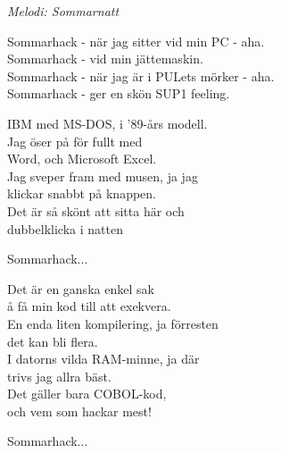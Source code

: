 {\footnotesize\textit{Melodi: Sommarnatt}}\par
\vspace{10pt}
Sommarhack - när jag sitter vid min PC - aha.\\
Sommarhack - vid min jättemaskin.\\
Sommarhack - när jag är i PULets mörker - aha.\\
Sommarhack - ger en skön SUP1 feeling.\par
\vspace{10pt}
IBM med MS-DOS, i ’89-års modell.\\
Jag öser på för fullt med \\
Word, och Microsoft Excel.\\
Jag sveper fram med musen, ja jag\\
klickar snabbt på knappen.\\
Det är så skönt att sitta här och\\
dubbelklicka i natten\par
\vspace{10pt}
Sommarhack...\par
\vspace{10pt}
Det är en ganska enkel sak\\
å få min kod till att exekvera.\\
En enda liten kompilering, ja förresten\\
det kan bli flera.\\
I datorns vilda RAM-minne, ja där\\
trivs jag allra bäst.\\
Det gäller bara COBOL-kod,\\
och vem som hackar mest!\par
\vspace{10pt}
Sommarhack...
